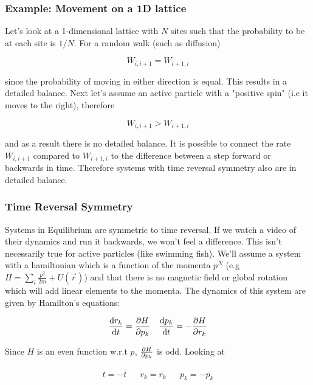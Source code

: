 \subsubsection{Example: Movement on a 1D lattice}

Let's look at a 1-dimensional lattice with $N$ sites such that the probability to be at each site is $1/N$. For a random walk (such as diffusion)

\begin{equation}
	W_{i,i+1} = W_{i+1,i}
\end{equation}

since the probability of moving in either direction is equal. This results in a detailed balance. Next let's assume an active particle with a "positive spin" (i.e it moves to the right), therefore

\begin{equation}
	W_{i,i+1} > W_{i+1,i}
\end{equation}

and as a result there is no detailed balance. It is possible to connect the rate $W_{i,i+1}$ compared to $W_{i+1,i}$ to the difference between a step forward or backwards in time. Therefore systems with time reversal symmetry also are in detailed balance.

\subsubsection{Time Reversal Symmetry}

Systems in Equilibrium are symmetric to time reversal. If we watch a video of their dynamics and run it backwards, we won't feel a difference. This isn't necessarily true for active particles (like swimming fish). We'll assume a system with a hamiltonian which is a function of the momenta $p^N$ (e.g $H=\sum\limits_i\frac{p^2}{2m}+U(\vec r)$) and that there is no magnetic field or global rotation which will add linear elements to the momenta. The dynamics of this system are given by Hamilton's equations:

\begin{align}
	\diff{r_k}{t} = \diffp{H}{p_k} && \diff{p_k}{t} = -\diffp{H}{r_k}
\end{align}

Since $H$ is an even function w.r.t $p$, $\diffp{H}{p_k}$ is odd. Looking at

\begin{align}
	t = -\overline{t} && r_k = \overline{r_k} && p_k = -\overline{p_k}
\end{align}

